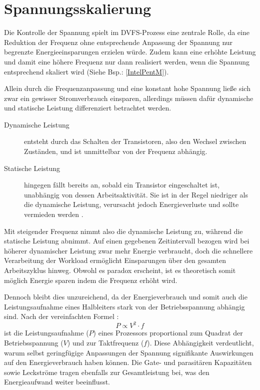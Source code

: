 \documentclass[footmark=none]{tubaf-thesis}
\begin{document}
    	\section{Spannungsskalierung}
    		Die Kontrolle der Spannung spielt im DVFS-Prozess eine zentrale Rolle, da eine Reduktion der Frequenz ohne entsprechende Anpassung der Spannung nur begrenzte Energieeinsparungen erzielen würde. Zudem kann eine erhöhte Leistung und damit eine höhere Frequenz nur dann realisiert werden, wenn die Spannung entsprechend skaliert wird (Siehe Bsp.: \autoref{IntelPentM}).
    	
    		Allein durch die Frequenzanpassung und eine konstant hohe Spannung ließe sich zwar ein gewisser Stromverbrauch einsparen, allerdings müssen dafür dynamische und statische Leistung differenziert betrachtet werden.
    	
    		\begin{description}
    			\item[Dynamische Leistung] entsteht durch das Schalten der Transistoren, also den Wechsel zwischen Zuständen, und ist unmittelbar von der Frequenz abhängig.
    			\item[Statische Leistung] hingegen fällt bereits an, sobald ein Transistor eingeschaltet ist, unabhängig von dessen Arbeitsaktivität. Sie ist in der Regel niedriger als die dynamische Leistung, verursacht jedoch Energieverluste und sollte vermieden werden \cite{klar2015integrierte}.
    		\end{description}

    		Mit steigender Frequenz nimmt also die dynamische Leistung zu, während die statische Leistung abnimmt. Auf einen gegebenen Zeitintervall bezogen wird bei höherer dynamischer Leistung zwar mehr Energie verbraucht, doch die schnellere Verarbeitung der Workload ermöglicht Einsparungen über den gesamten Arbeitszyklus hinweg. Obwohl es paradox erscheint,  ist es theoretisch somit möglich Energie sparen indem die Frequenz erhöht wird.
    	
    		Dennoch bleibt dies unzureichend, da der Energieverbrauch und somit auch die Leistungsaufnahme eines Halbleiters stark von der Betriebsspannung abhängig sind. Nach der vereinfachten Formel \cite{inbook}:
    		\[P \propto V^2 \cdot f\] 
    		ist die Leistungsaufnahme ($P$) eines Prozessors proportional zum Quadrat der Betriebsspannung ($V$) und zur Taktfrequenz ($f$). Diese Abhängigkeit verdeutlicht, warum selbst geringfügige Anpassungen der Spannung signifikante Auswirkungen auf den Energieverbrauch haben können. Die Gate- und parasitären Kapazitäten sowie Leckströme tragen ebenfalls zur Gesamtleistung bei, was den Energieaufwand weiter beeinflusst. \cite{inbook}
        
\end{document}
